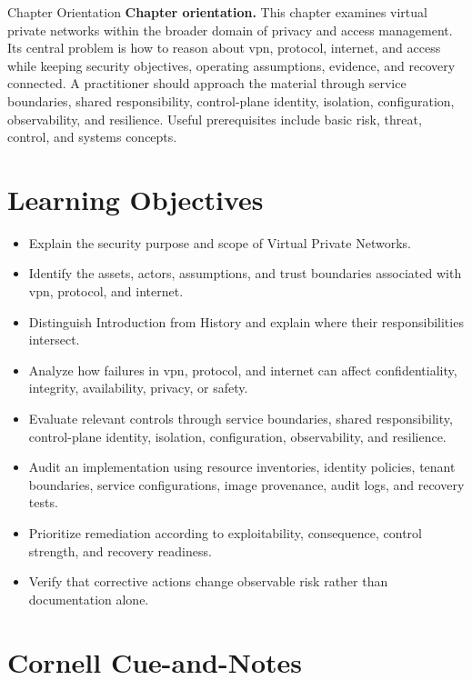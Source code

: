 \documentclass[11pt,letterpaper]{article}
\title{\CornellDocumentTitle}
\author{}
\date{}
\begin{document}
\maketitle
\begin{CornellOverviewBox}{Chapter Orientation}
\textbf{Chapter orientation.} This chapter examines virtual private networks within the broader domain of privacy and access management. Its central problem is how to reason about vpn, protocol, internet, and access while keeping security objectives, operating assumptions, evidence, and recovery connected. A practitioner should approach the material through service boundaries, shared responsibility, control-plane identity, isolation, configuration, observability, and resilience. Useful prerequisites include basic risk, threat, control, and systems concepts.
\end{CornellOverviewBox}
\section*{Learning Objectives}
\begin{itemize}
\item Explain the security purpose and scope of Virtual Private Networks.
\item Identify the assets, actors, assumptions, and trust boundaries associated with vpn, protocol, and internet.
\item Distinguish Introduction from History and explain where their responsibilities intersect.
\item Analyze how failures in vpn, protocol, and internet can affect confidentiality, integrity, availability, privacy, or safety.
\item Evaluate relevant controls through service boundaries, shared responsibility, control-plane identity, isolation, configuration, observability, and resilience.
\item Audit an implementation using resource inventories, identity policies, tenant boundaries, service configurations, image provenance, audit logs, and recovery tests.
\item Prioritize remediation according to exploitability, consequence, control strength, and recovery readiness.
\item Verify that corrective actions change observable risk rather than documentation alone.
\end{itemize}
\section*{Cornell Cue-and-Notes}
\end{document}
